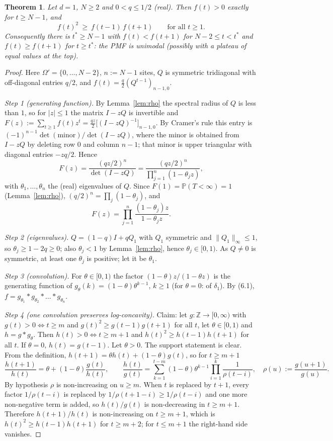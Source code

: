 \documentclass[11pt,a4paper]{article}
\newtheorem{theorem}{Theorem}
\theoremstyle{definition}
\theoremstyle{remark}
\begin{document}
\begin{theorem}\label{thm:logconcave}
Let $d=1$, $N\ge2$ and $0<q\le1/2$ (real). Then $f(t)>0$ exactly for $t\ge N-1$, and
\[
f(t)^2\ \ge\ f(t-1)\,f(t+1)\qquad\text{for all }t\ge1 .
\]
Consequently there is $t^*\ge N-1$ with $f(t)<f(t+1)$ for $N-2\le t<t^*$ and $f(t)\ge f(t+1)$ for $t\ge t^*$: the PMF is unimodal (possibly with a plateau of equal values at the top).
\end{theorem}
\begin{proof}
Here $\Omega'=\{0,\dots,N-2\}$, $n:=N-1$ sites, $Q$ is symmetric tridiagonal with off-diagonal entries $q/2$, and $f(t)=\frac q2(Q^{t-1})_{n-1,0}$.

\emph{Step 1 (generating function).} By Lemma~\ref{lem:rho} the spectral radius of $Q$ is less than $1$, so for $|z|\le1$ the matrix $I-zQ$ is invertible and $F(z):=\sum_{t\ge1}f(t)z^t=\frac{qz}2\bigl[(I-zQ)^{-1}\bigr]_{n-1,0}$. By Cramer's rule this entry is $(-1)^{n-1}\det(\text{minor})/\det(I-zQ)$, where the minor is obtained from $I-zQ$ by deleting row $0$ and column $n-1$; that minor is upper triangular with diagonal entries $-zq/2$. Hence
\[
F(z)=\frac{(qz/2)^n}{\det(I-zQ)}=\frac{(qz/2)^n}{\prod_{j=1}^n(1-\theta_jz)},
\]
with $\theta_1,\dots,\theta_n$ the (real) eigenvalues of $Q$. Since $F(1)=\mathbb P(T<\infty)=1$ (Lemma~\ref{lem:rho}), $(q/2)^n=\prod_j(1-\theta_j)$, and
\[
F(z)=\prod_{j=1}^n\frac{(1-\theta_j)z}{1-\theta_jz}. \tag{6.1}
\]

\emph{Step 2 (eigenvalues).} $Q=(1-q)I+qQ_1$ with $Q_1$ symmetric and $\|Q_1\|_\infty\le1$, so $\theta_j\ge1-2q\ge0$; also $\theta_j<1$ by Lemma~\ref{lem:rho}, hence $\theta_j\in[0,1)$. As $Q\ne0$ is symmetric, at least one $\theta_j$ is positive; let it be $\theta_1$.

\emph{Step 3 (convolution).} For $\theta\in[0,1)$ the factor $(1-\theta)z/(1-\theta z)$ is the generating function of $g_\theta(k)=(1-\theta)\theta^{k-1}$, $k\ge1$ (for $\theta=0$: of $\delta_1$). By (6.1), $f=g_{\theta_1}*g_{\theta_2}*\dots*g_{\theta_n}$.

\emph{Step 4 (one convolution preserves log-concavity).} Claim: let $g:\mathbb Z\to[0,\infty)$ with $g(t)>0\iff t\ge m$ and $g(t)^2\ge g(t-1)g(t+1)$ for all $t$, let $\theta\in[0,1)$ and $h=g*g_\theta$. Then $h(t)>0\iff t\ge m+1$ and $h(t)^2\ge h(t-1)h(t+1)$ for all $t$.
If $\theta=0$, $h(t)=g(t-1)$. Let $\theta>0$. The support statement is clear. From the definition, $h(t+1)=\theta h(t)+(1-\theta)g(t)$, so for $t\ge m+1$
\[
\frac{h(t+1)}{h(t)}=\theta+(1-\theta)\frac{g(t)}{h(t)},\qquad \frac{h(t)}{g(t)}=\sum_{k=1}^{t-m}(1-\theta)\theta^{k-1}\prod_{i=1}^k\frac1{\rho(t-i)},\quad \rho(u):=\frac{g(u+1)}{g(u)} .
\]
By hypothesis $\rho$ is non-increasing on $u\ge m$. When $t$ is replaced by $t+1$, every factor $1/\rho(t-i)$ is replaced by $1/\rho(t+1-i)\ge1/\rho(t-i)$ and one more non-negative term is added, so $h(t)/g(t)$ is non-decreasing in $t\ge m+1$. Therefore $h(t+1)/h(t)$ is non-increasing on $t\ge m+1$, which is $h(t)^2\ge h(t-1)h(t+1)$ for $t\ge m+2$; for $t\le m+1$ the right-hand side vanishes.


\end{proof}
\end{document}
